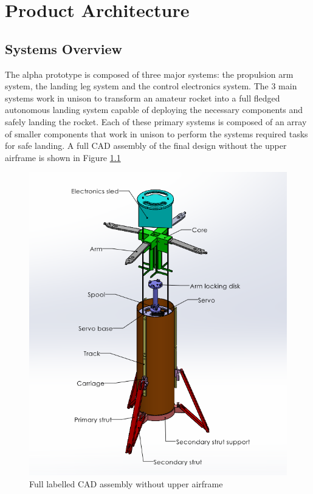 \chapter{Product Architecture}

\section{Systems Overview} 
The alpha prototype is composed of three major systems: the propulsion arm system, the landing leg system and the control electronics system. The 3 main systems work in unison to transform an amateur rocket into a full fledged autonomous landing system capable of deploying the necessary components and safely landing the rocket. Each of these primary systems is composed of an array of smaller components that work in unison to perform the systems required tasks for safe landing. A full CAD assembly of the final design without the upper airframe is shown in Figure \ref{arch:full-cad:labelled}
\begin{figure}[H]
    \centering
    \includegraphics[width=\textwidth]{src/figs/full-labelled-cad-assembly.png}
    \caption{Full labelled CAD assembly without upper airframe}
    \label{arch:full-cad:labelled}
\end{figure}

